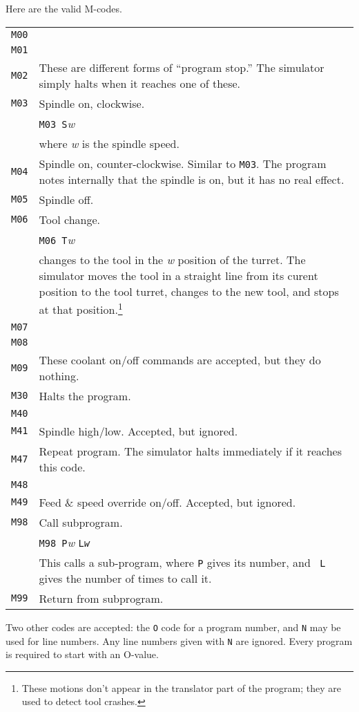 \documentclass[titlepage,oneside,10pt]{article}
\begin{document}
Here are the valid M-codes.
\vskip 0.25cm
\begin{longtable}{lp{10cm}}
{\tt M00}&\\
{\tt M01}&\\
{\tt M02}&These are different forms of ``program stop.'' The simulator
simply halts when it reaches one of these.\\
{\tt M03}&Spindle on, clockwise.\\
&         {\tt M03 S}\emph{w}\\
& where \emph{w} is the spindle speed.\\
{\tt M04}&Spindle on, counter-clockwise. Similar to {\tt M03}. The
program notes internally that the spindle is on, but it has no real
effect.\\
{\tt M05}&Spindle off.\\
{\tt M06}&Tool change.\\
& {\tt M06 T}\emph{w}\\
& changes to the tool in the \emph{w} position of the turret. The
simulator moves the tool in a straight line from its curent position
to the tool turret, changes to the new tool, and stops at that
position.\footnote{These motions don't appear in the translator part of the
  program; they are used to detect tool crashes.} \\
{\tt M07}&\\
{\tt M08}&\\
{\tt M09}&These coolant on/off commands are accepted, but they do
nothing.\\
{\tt M30}&Halts the program.\\
{\tt M40}&\\
{\tt M41}&Spindle high/low. Accepted, but ignored.\\
{\tt M47}&Repeat program. The simulator halts immediately if it
reaches this code.\\
{\tt M48}&\\
{\tt M49}&Feed \& speed override on/off. Accepted, but ignored.\\
{\tt M98}&Call subprogram.\\
&{\tt M98 P}\emph{w} {\tt L\emph{w}}\\
& This calls a sub-program, where {\tt P} gives its number, and {\tt
  L} gives the number of times to call it.\\
{\tt M99}&Return from subprogram.
\end{longtable}

Two other codes are accepted: the {\tt O} code for a program number,
and {\tt N} may be used for line numbers. Any line numbers given with
{\tt N} are ignored. Every program is required to start with an O-value.
\end{document}
